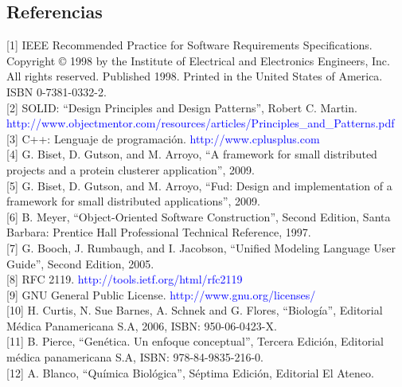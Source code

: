 \documentclass[10pt,a4paper,english,spanish]{article}
\begin{document}
\subsection{Referencias}
[1] IEEE Recommended Practice for Software Requirements Specifications. Copyright © 1998 by the Institute of Electrical and Electronics Engineers, Inc. All rights reserved. Published 1998. Printed in the United States of America. ISBN 0-7381-0332-2. \\

[2] SOLID: ``Design Principles and Design Patterns'', Robert C. Martin. \textcolor{blue}{http://www.objectmentor.com/resources/articles/Principles\_and\_Patterns.pdf} \\

[3] C++: Lenguaje de programación. \textcolor{blue}{http://www.cplusplus.com} \\

[4] G. Biset, D. Gutson, and M. Arroyo, “A framework for small distributed projects and a protein clusterer application”, 2009. \\

[5] G. Biset, D. Gutson, and M. Arroyo, “Fud: Design and implementation of a framework for small distributed applications”, 2009. \\

[6] B. Meyer, “Object-Oriented Software Construction”, Second Edition, Santa Barbara: Prentice Hall Professional Technical Reference, 1997. \\

[7] G. Booch, J. Rumbaugh, and I. Jacobson, “Unified Modeling Language User Guide”, Second Edition, 2005. \\

[8] RFC 2119. \textcolor{blue}{http://tools.ietf.org/html/rfc2119} \\

[9] GNU General Public License. \textcolor{blue}{http://www.gnu.org/licenses/} \\

[10] H. Curtis, N. Sue Barnes, A. Schnek and G. Flores, “Biología”, Editorial Médica Panamericana S.A, 2006, ISBN: 950-06-0423-X. \\

[11] B. Pierce, “Genética. Un enfoque conceptual”, Tercera Edición, Editorial médica panamericana S.A, ISBN: 978-84-9835-216-0. \\

[12] A. Blanco, “Química Biológica”, Séptima Edición, Editorial El Ateneo. \\
\end{document}
